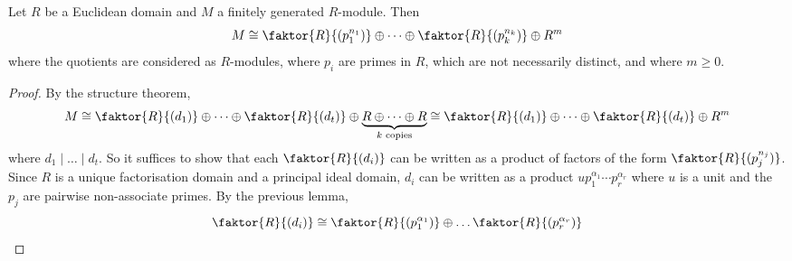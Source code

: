 \begin{lemma}
	Let \( R \) be a Euclidean domain and \( M \) a finitely generated \( R \)-module.
	Then
	\[ M \cong \faktor{R}{(p_1^{n_1})} \oplus \dots \oplus \faktor{R}{(p_k^{n_k})} \oplus R^m \]
	where the quotients are considered as \( R \)-modules, where \( p_i \) are primes in \( R \), which are not necessarily distinct, and where \( m \geq 0 \).
\end{lemma}
\begin{proof}
	By the structure theorem,
	\[ M \cong \faktor{R}{(d_1)} \oplus \dots \oplus \faktor{R}{(d_t)} \oplus \underbrace{R \oplus \dots \oplus R}_{k \text{ copies}} \cong \faktor{R}{(d_1)} \oplus \dots \oplus \faktor{R}{(d_t)} \oplus R^m \]
	where \( d_1 \mid \dots \mid d_t \).
	So it suffices to show that each \( \faktor{R}{(d_i)} \) can be written as a product of factors of the form \( \faktor{R}{(p_j^{n_j})} \).
	Since \( R \) is a unique factorisation domain and a principal ideal domain, \( d_i \) can be written as a product \( u p_1^{\alpha_1} \cdots p_r^{\alpha_r} \) where \( u \) is a unit and the \( p_j \) are pairwise non-associate primes.
	By the previous lemma,
	\[ \faktor{R}{(d_i)} \cong \faktor{R}{(p_1^{\alpha_1})} \oplus \dots \faktor{R}{(p_r^{\alpha_r})} \]
\end{proof}

